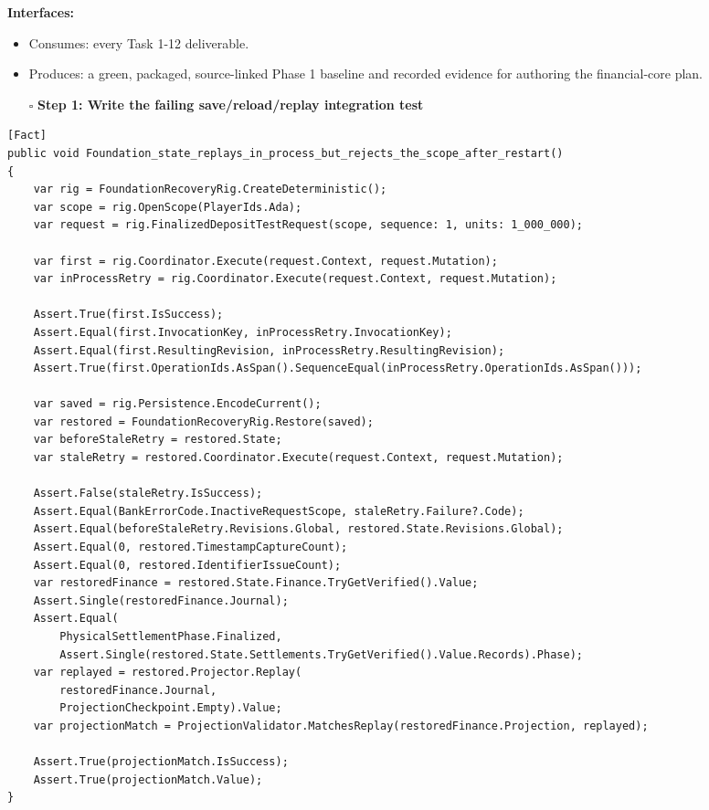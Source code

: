 \documentclass[
  10pt,
  letterpaper,
]{article}
\providecommand{\tightlist}{%
  \setlength{\itemsep}{0pt}\setlength{\parskip}{0pt}}
\begin{document}
\textbf{Interfaces:}

\begin{itemize}
\tightlist
\item
  Consumes: every Task 1-12 deliverable.
\item
  Produces: a green, packaged, source-linked Phase 1 baseline and
  recorded evidence for authoring the financial-core plan.
\end{itemize}

\begin{itemize}
\tightlist
\item[$\square$]
  \textbf{Step 1: Write the failing
  save/\allowbreak{}reload/\allowbreak{}replay integration test}
\end{itemize}

\begin{lstlisting}
[Fact]
public void Foundation_state_replays_in_process_but_rejects_the_scope_after_restart()
{
    var rig = FoundationRecoveryRig.CreateDeterministic();
    var scope = rig.OpenScope(PlayerIds.Ada);
    var request = rig.FinalizedDepositTestRequest(scope, sequence: 1, units: 1_000_000);

    var first = rig.Coordinator.Execute(request.Context, request.Mutation);
    var inProcessRetry = rig.Coordinator.Execute(request.Context, request.Mutation);

    Assert.True(first.IsSuccess);
    Assert.Equal(first.InvocationKey, inProcessRetry.InvocationKey);
    Assert.Equal(first.ResultingRevision, inProcessRetry.ResultingRevision);
    Assert.True(first.OperationIds.AsSpan().SequenceEqual(inProcessRetry.OperationIds.AsSpan()));

    var saved = rig.Persistence.EncodeCurrent();
    var restored = FoundationRecoveryRig.Restore(saved);
    var beforeStaleRetry = restored.State;
    var staleRetry = restored.Coordinator.Execute(request.Context, request.Mutation);

    Assert.False(staleRetry.IsSuccess);
    Assert.Equal(BankErrorCode.InactiveRequestScope, staleRetry.Failure?.Code);
    Assert.Equal(beforeStaleRetry.Revisions.Global, restored.State.Revisions.Global);
    Assert.Equal(0, restored.TimestampCaptureCount);
    Assert.Equal(0, restored.IdentifierIssueCount);
    var restoredFinance = restored.State.Finance.TryGetVerified().Value;
    Assert.Single(restoredFinance.Journal);
    Assert.Equal(
        PhysicalSettlementPhase.Finalized,
        Assert.Single(restored.State.Settlements.TryGetVerified().Value.Records).Phase);
    var replayed = restored.Projector.Replay(
        restoredFinance.Journal,
        ProjectionCheckpoint.Empty).Value;
    var projectionMatch = ProjectionValidator.MatchesReplay(restoredFinance.Projection, replayed);

    Assert.True(projectionMatch.IsSuccess);
    Assert.True(projectionMatch.Value);
}
\end{lstlisting}
\end{document}
